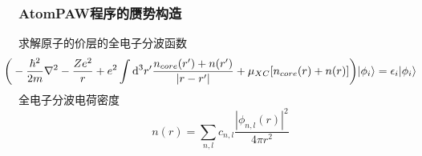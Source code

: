 %

\frame
{
	\frametitle{\textrm{AtomPAW}程序的赝势构造}
	求解原子的价层的全电子分波函数
	{\fontsize{9.0pt}{5.2pt}\selectfont$$\hspace*{-17pt}\bigg(-\dfrac{\hbar^2}{2m}\nabla^2-\dfrac{Ze^2}r+e^2\int\mathrm{d}^3r^{\prime}\dfrac{n_{core}(r^{\prime})+n(r^{\prime})}{|r-r^{\prime}|}+\mu_{XC}[n_{core}(r)+n(r)]\bigg)|\phi_i\rangle=\epsilon_i|\phi_i\rangle$$}
	全电子分波电荷密度
	$$n(r)=\sum_{n,l}c_{n,l}\dfrac{|\phi_{n,l}(r)|^2}{4\pi r^2}$$
}

